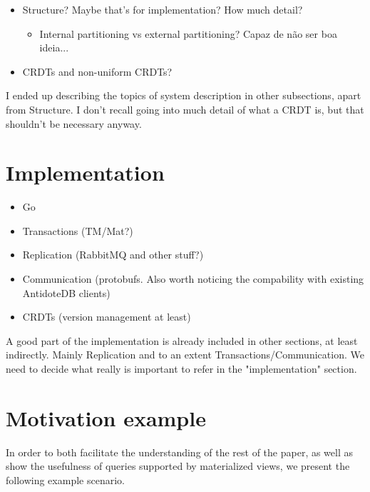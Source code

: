 \documentclass{vldb}
\newcommand{\grumbler}[2]{{\color{red}{\bf #1:} #2}}
\newcommand{\andre}[1]{\grumbler{andre}{#1}}
\begin{document}
\begin{itemize}
\item Structure? Maybe that's for implementation? How much detail?
\begin{itemize}
	\item Internal partitioning vs external partitioning? Capaz de não ser boa ideia...	
\end{itemize}
\item CRDTs and non-uniform CRDTs?
\end{itemize}

\andre{I ended up describing the topics of system description in other subsections, apart from Structure. I don't recall going into much detail of what a CRDT is, but that shouldn't be necessary anyway.}

\section{Implementation}

\begin{itemize}
	\item Go
	\item Transactions (TM/Mat?)
	\item Replication (RabbitMQ and other stuff?)
	\item Communication (protobufs. Also worth noticing the compability with existing AntidoteDB clients)
	\item CRDTs (version management at least)
\end{itemize}

\andre{A good part of the implementation is already included in other sections, at least indirectly. Mainly Replication and to an extent Transactions/Communication. We need to decide what really is important to refer in the "implementation" section.}

\null\newpage

\section{Motivation example}
\label{sec:example}


In order to both facilitate the understanding of the rest of the paper, as well as show the usefulness of queries supported by materialized views, we present the following example scenario.
\end{document}
